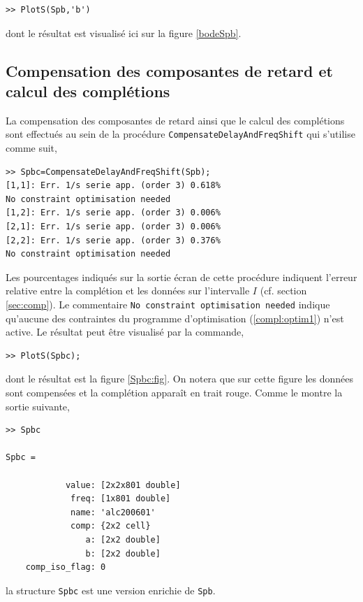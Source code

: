 \documentclass[12]{article}
\begin{document}
\begin{verbatim}
>> PlotS(Spb,'b')
\end{verbatim}
dont le r\'esultat est visualis\'e ici sur la figure \ref{bodeSpb}.

\subsection{Compensation des composantes de retard et calcul des
  compl\'etions}

La compensation des composantes de retard ainsi que le calcul des
compl\'etions sont effectu\'es au sein de la proc\'edure
\verb+CompensateDelayAndFreqShift+ qui s'utilise comme suit,

\begin{verbatim}
>> Spbc=CompensateDelayAndFreqShift(Spb);
[1,1]: Err. 1/s serie app. (order 3) 0.618% 
No constraint optimisation needed 
[1,2]: Err. 1/s serie app. (order 3) 0.006% 
[2,1]: Err. 1/s serie app. (order 3) 0.006% 
[2,2]: Err. 1/s serie app. (order 3) 0.376% 
No constraint optimisation needed 
\end{verbatim}

Les pourcentages indiqu\'es sur la sortie \'ecran de cette proc\'edure
indiquent l'erreur relative entre la compl\'etion et les donn\'ees sur
l'intervalle $I$ (cf. section \ref{sec:comp}). Le commentaire 
\verb+No constraint optimisation needed+ indique qu'aucune des contraintes du
programme d'optimisation (\ref{compl:optim1}) n'est active. Le r\'esultat peut \^etre 
visualis\'e par la commande,

\begin{verbatim}
>> PlotS(Spbc);
\end{verbatim}

dont le r\'esultat est la figure \ref{Spbc:fig}. On notera que sur cette figure les
donn\'ees sont compens\'ees et la compl\'etion appara\^it en trait rouge. Comme le montre la sortie suivante, 

\begin{verbatim}
>> Spbc

Spbc = 

            value: [2x2x801 double]
             freq: [1x801 double]
             name: 'alc200601'
             comp: {2x2 cell}
                a: [2x2 double]
                b: [2x2 double]
    comp_iso_flag: 0

\end{verbatim}
la structure \verb+Spbc+ est une version enrichie de \verb+Spb+. 
\end{document}
